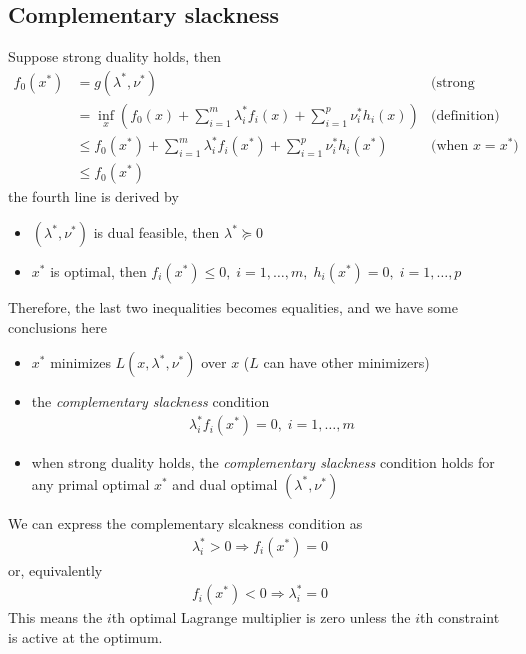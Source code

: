 \subsection{Complementary slackness}
\label{subsec:5.5.2}
Suppose strong duality holds, then
\begin{align*}
  f_0(x^\ast)&=   g(\lambda^\ast,\nu^\ast) &\text{(strong duality)}\\
             &=   \inf_{x}\left(f_0(x)+\sum_{i=1}^m\lambda_i^\ast f_i(x)+\sum_{i=1}^p\nu_i^\ast h_i(x)\right) &\text{(definition)}\\
             &\le f_0(x^\ast)+\sum_{i=1}^m\lambda_i^\ast f_i(x^\ast)+\sum_{i=1}^p\nu_i^\ast h_i(x^\ast) &\text{(when $x=x^\ast$)}\\
             &\le f_0(x^\ast)
\end{align*}
the fourth line is derived by
\begin{itemize}
  \item $(\lambda^\ast,\nu^\ast)$ is dual feasible, then $\lambda^\ast\succeq 0$
  \item $x^\ast$ is optimal, then $f_i(x^\ast)\le 0,\;i=1,\dots,m,\;h_i(x^\ast)=0,\;i=1,\dots,p$
\end{itemize}
Therefore, the last two inequalities becomes equalities, and we have some conclusions here
\begin{itemize}
  \item $x^\ast$ minimizes $L(x,\lambda^\ast,\nu^\ast)$ over $x$ ($L$ can have other minimizers)
  \item the \textit{complementary slackness} condition
        \begin{align}
          \lambda_i^\ast f_i(x^\ast)=0,\;i=1,\dots,m\label{eq:5.48}
        \end{align}
  \item when strong duality holds, the \textit{complementary slackness} condition holds for any primal optimal $x^\ast$ and dual optimal $(\lambda^\ast,\nu^\ast)$
\end{itemize}
We can express the complementary slcakness condition as
\begin{align*}
  \lambda_i^\ast>0\Rightarrow f_i(x^\ast)=0
\end{align*}
or, equivalently
\begin{align*}
  f_i(x^\ast)<0\Rightarrow\lambda_i^\ast=0
\end{align*}
This means the $i$th optimal Lagrange multiplier is zero unless the $i$th constraint is active at the optimum.

